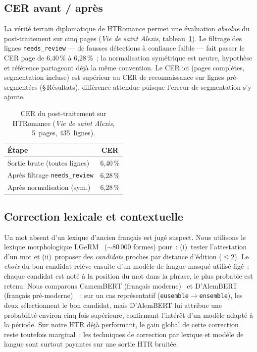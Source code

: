 \documentclass[10pt,journal,a4paper]{IEEEtran}
\begin{document}
\subsection{CER avant / après}
La vérité terrain diplomatique de HTRomance permet une évaluation \emph{absolue}
du post-traitement sur cinq pages (\textit{Vie de saint Alexis},
tableau~\ref{tab:nlp}). Le filtrage des lignes \texttt{needs\_review} --- de
fausses détections à confiance faible --- fait passer le CER page de 6,40\,\% à
6,28\,\%~; la normalisation symétrique est neutre, hypothèse et référence
partageant déjà la même convention. Le CER ici (pages complètes, segmentation
incluse) est supérieur au CER de reconnaissance sur lignes pré-segmentées
(\S\,Résultats), différence attendue puisque l'erreur de segmentation s'y ajoute.

\begin{table}[!t]
\centering
\caption{CER du post-traitement sur HTRomance (\textit{Vie de saint Alexis},
5~pages, 435~lignes).}
\label{tab:nlp}
\begin{tabular}{lc}
\toprule
Étape & CER \\
\midrule
Sortie brute (toutes lignes) & 6,40\,\% \\
Après filtrage \texttt{needs\_review} & 6,28\,\% \\
Après normalisation (sym.) & 6,28\,\% \\
\bottomrule
\end{tabular}
\end{table}

\subsection{Correction lexicale et contextuelle}
Un mot absent d'un lexique d'ancien français est jugé suspect. Nous utilisons le
lexique morphologique LGeRM~\cite{lgerm} ($\sim$80\,000 formes) pour~: (i)~tester
l'attestation d'un mot et (ii)~proposer des \emph{candidats} proches par distance
d'édition ($\leq 2$). Le \emph{choix} du bon candidat relève ensuite d'un modèle
de langue masqué utilisé figé~: chaque candidat est noté à la position du mot
dans la phrase, le plus probable est retenu. Nous comparons CamemBERT (français
moderne)~\cite{camembert} et D'AlemBERT (français pré-moderne)~\cite{dalembert}~:
sur un cas représentatif (\texttt{eusemble}$\to$\texttt{ensemble}), les deux
sélectionnent le bon candidat, mais D'AlemBERT lui attribue une probabilité
environ cinq fois supérieure, confirmant l'intérêt d'un modèle adapté à la
période. Sur notre HTR déjà performant, le gain global de cette correction reste
toutefois marginal~: les techniques de correction par lexique et modèle de langue
sont surtout payantes sur une sortie HTR bruitée.
\end{document}
